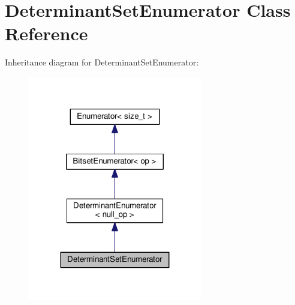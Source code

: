 \hypertarget{classDeterminantSetEnumerator}{}\section{Determinant\+Set\+Enumerator Class Reference}
\label{classDeterminantSetEnumerator}


Inheritance diagram for Determinant\+Set\+Enumerator\+:
\nopagebreak
\begin{figure}[H]
\begin{center}
\leavevmode
\includegraphics[width=215pt]{classDeterminantSetEnumerator__inherit__graph}
\end{center}
\end{figure}



